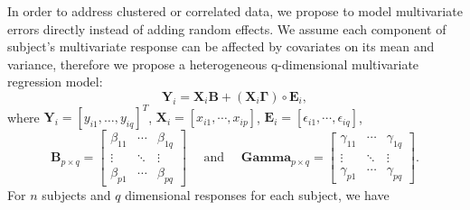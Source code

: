 In order to address clustered or correlated data, we propose to model
multivariate errors directly instead of adding random effects. We
assume each component of subject's multivariate response can be
affected by covariates on its mean and variance, therefore we propose
a heterogeneous q-dimensional multivariate regression model:
\begin{displaymath}
  \bm{Y}_i = \bm{X}_i \bm{B} + (\bm{X}_i\bm{\Gamma}) \circ \bm{E}_i,
\end{displaymath}
where $\bm{Y}_i = [y_{i1}, \ldots, y_{iq}]^T$, $\bm{X}_i= [x_{i1},
\cdots, x_{ip}]$, $\bm{E}_i =[\epsilon_{i1}, \cdots, \epsilon_{iq}]$,
\begin{displaymath}
  \bm{B}_{p\times q} =
  \begin{bmatrix}
    \beta_{11}& \cdots & \beta_{1q} \\
    \vdots & \ddots & \vdots \\
    \beta_{p1} & \cdots & \beta_{pq}
  \end{bmatrix}
  \quad \text{  and  } \quad
  \bm{Gamma}_{p\times q} =
  \begin{bmatrix}
    \gamma_{11} & \cdots & \gamma_{1q} \\
    \vdots & \ddots & \vdots \\
    \gamma_{p1} & \cdots & \gamma_{pq}
  \end{bmatrix}.
\end{displaymath}
For $n$ subjects and $q$ dimensional responses for each subject, we
have
